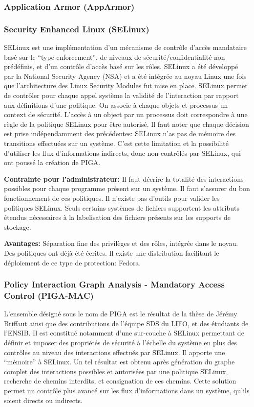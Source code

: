 \documentclass[pdftex,a4paper,titlepage,11pt]{article}
\begin{document}
\subsubsection{Application Armor (AppArmor)}

\subsubsection{Security Enhanced Linux (SELinux)}
SELinux est une implémentation d'un mécanisme de contrôle d'accès mandataire
basé sur le ``type enforcement'', de niveaux de sécurité/confidentialité non
prédéfinis, et d'un contrôle d'accès basé sur les rôles. SELinux a été développé
par la National Security Agency (NSA) et a été intégrée au noyau Linux une fois
que l'architecture des Linux Security Modules fut mise en place. SELinux permet
de contrôler pour chaque appel système la validité de l'interaction par rapport
aux définitions d'une politique. On associe à chaque objets et processus un
context de sécurité. L'accès à un object par un processus doit correspondre à
une règle de la politique SELinux pour être autorisé. Il faut noter que chaque
décision est prise indépendamment des précédentes: SELinux n'as pas de mémoire
des transitions effectuées sur un système. C'est cette limitation et la
possibilité d'utiliser les flux d'informations indirects, donc non contrôlés par
SELinux, qui ont poussé la création de PIGA.

\begin{list}{}{}
 \item \textbf{Contrainte pour l'administrateur:} Il faut décrire la totalité
des interactions possibles pour chaque programme présent sur un système. Il faut
s'assurer du bon fonctionnement de ces politiques. Il n'existe pas d'outils pour
valider les politiques SELinux. Seuls certains systèmes de fichiers supportent
les attributs étendus nécessaires à la labelisation des fichiers présents sur
les supports de stockage.
 \item \textbf{Avantages:} Séparation fine des privilèges et des rôles, intégrée
dans le noyau. Des politiques ont déjà été écrites. Il existe une distribution
facilitant le déploiement de ce type de protection: Fedora.
\end{list}

\subsubsection{Policy Interaction Graph Analysis - Mandatory Access Control
(PIGA-MAC)}
L'ensemble désigné sous le nom de PIGA est le résultat de la thèse de Jérémy
Briffaut ainsi que des contributions de l'équipe SDS du LIFO, et des étudiants
de l'ENSIB. Il est constitué notamment d'une sur-couche à SELinux permettant de
définir et imposer des propriétés de sécurité à l'échelle du système en plus des
contrôles au niveau des interactions effectués par SELinux. Il apporte une
``mémoire'' à SELinux. Un tel résultat est obtenu après génération du graphe
complet des interactions possibles et autorisées par une politique SELinux,
recherche de chemins interdits, et consignation de ces chemins. Cette solution
permet un contrôle plus avancé sur les flux d'informations dans un système,
qu'ils soient directs ou indirects.
\end{document}
